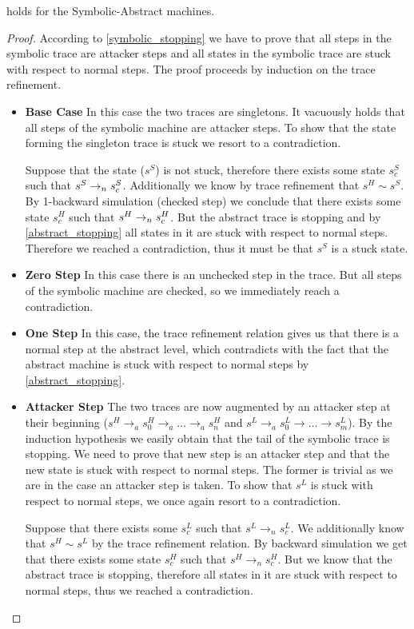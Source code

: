 \begin{lemma}
  \label{as_implies_ss}
   holds for the Symbolic-Abstract machines.
\end{lemma}
\begin{proof}
  According to \cref{symbolic_stopping} we have to prove that all steps
  in the symbolic trace are attacker steps and all states in the symbolic
  trace are stuck with respect to normal steps.
  The proof proceeds by induction on the trace refinement.
  \begin{itemize}
  \item \textbf{Base Case} In this case the two traces are singletons.
    It vacuously holds that all steps of the symbolic machine are
    attacker steps. To show that the state forming the singleton trace
    is stuck we resort to a contradiction.

    Suppose that the state ($s^S$) is not stuck, therefore there
    exists some state $s^S_c$ such that
    $s^S\to_ns^S_c$. Additionally we know by trace refinement that
    $s^H \sim s^S$. By 1-backward simulation (checked step) we
    conclude that there exists some state $s^H_c$ such that
    $s^H\to_ns^H_c$. But the abstract trace is stopping and by
    \cref{abstract_stopping} all states in it are stuck with respect
    to normal steps. Therefore we reached a contradiction, thus it
    must be that $s^S$ is a stuck state.
  \item \textbf{Zero Step} In this case there is an unchecked step
    in the trace. But all steps of the symbolic machine are checked,
    so we immediately reach a contradiction.
  \item \textbf{One Step} In this case, the trace refinement relation
    gives us that there is a normal step at the abstract level, which
    contradicts with the fact that the abstract machine is stuck
    with respect to normal steps by \cref{abstract_stopping}.
  \item \textbf{Attacker Step} The two traces are now augmented by an
    attacker step at their beginning ($s^H \to_a s^H_0 \to_a \ldots
    \to_a s^H_n$ and $s^L \to_a s^L_0 \to \ldots \to s^L_m$). By the
    induction hypothesis we easily obtain that the tail of the
    symbolic trace is stopping. We need to prove that new step is an
    attacker step and that the new state is stuck with respect to
    normal steps. The former is trivial as we are in the case an
    attacker step is taken. To show that $s^L$ is stuck with
    respect to normal steps, we once again resort to a contradiction.

    Suppose that there exists some $s^L_c$ such that $s^L \to_n s^L_c$.
    We additionally know that $s^H \sim s^L$ by the trace refinement
    relation. By backward simulation we get that there exists
    some state $s^H_c$ such that $s^H \to_n s^H_c$. But we know that
    the abstract trace is stopping, therefore all states in it
    are stuck with respect to normal steps, thus we reached
    a contradiction.
  \end{itemize}
\end{proof}

